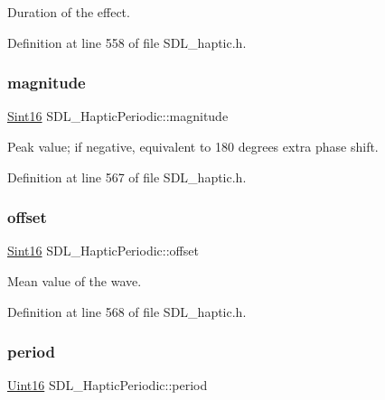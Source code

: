 Duration of the effect. 

Definition at line 558 of file S\+D\+L\+\_\+haptic.\+h.

\mbox{\label{struct_s_d_l___haptic_periodic_aad0ad2b00c7e6959da627663d91f7b94}} 
\subsubsection{\texorpdfstring{magnitude}{magnitude}}
{\footnotesize\ttfamily \mbox{\hyperlink{_s_d_l__stdinc_8h_a9d0257032c0e146ab6121bf0122712f5}{Sint16}} S\+D\+L\+\_\+\+Haptic\+Periodic\+::magnitude}

Peak value; if negative, equivalent to 180 degrees extra phase shift. 

Definition at line 567 of file S\+D\+L\+\_\+haptic.\+h.

\mbox{\label{struct_s_d_l___haptic_periodic_abc7aa9e9c0d546cb54189a7812fbe554}} 
\subsubsection{\texorpdfstring{offset}{offset}}
{\footnotesize\ttfamily \mbox{\hyperlink{_s_d_l__stdinc_8h_a9d0257032c0e146ab6121bf0122712f5}{Sint16}} S\+D\+L\+\_\+\+Haptic\+Periodic\+::offset}

Mean value of the wave. 

Definition at line 568 of file S\+D\+L\+\_\+haptic.\+h.

\mbox{\label{struct_s_d_l___haptic_periodic_a0e7e105b96308129b248d52b56a2a839}} 
\subsubsection{\texorpdfstring{period}{period}}
{\footnotesize\ttfamily \mbox{\hyperlink{_s_d_l__stdinc_8h_a31fcc0a076c9068668173ee26d33e42b}{Uint16}} S\+D\+L\+\_\+\+Haptic\+Periodic\+::period}

